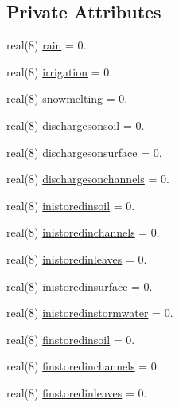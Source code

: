 \subsection*{Private Attributes}
\begin{DoxyCompactItemize}
\item 
real(8) \mbox{\hyperlink{structmodulebasin_1_1t__basinwaterbalance_a8f7c5330692702738e294ec2ccd8a474}{rain}} = 0.
\item 
real(8) \mbox{\hyperlink{structmodulebasin_1_1t__basinwaterbalance_a1dbb47de868c1a9349e7f869c9699a7c}{irrigation}} = 0.
\item 
real(8) \mbox{\hyperlink{structmodulebasin_1_1t__basinwaterbalance_a40065b32c6c5b9bbaade8b7ede889af0}{snowmelting}} = 0.
\item 
real(8) \mbox{\hyperlink{structmodulebasin_1_1t__basinwaterbalance_a606aef9b14a0836870ecaa5e7cbed6ba}{dischargesonsoil}} = 0.
\item 
real(8) \mbox{\hyperlink{structmodulebasin_1_1t__basinwaterbalance_a9ee971cf789e49184148ad047a0b6446}{dischargesonsurface}} = 0.
\item 
real(8) \mbox{\hyperlink{structmodulebasin_1_1t__basinwaterbalance_ab7a1622ba69b5813775a2c90e9eea6e9}{dischargesonchannels}} = 0.
\item 
real(8) \mbox{\hyperlink{structmodulebasin_1_1t__basinwaterbalance_aadd2708b18e1ac3061d23c041b14ee9e}{inistoredinsoil}} = 0.
\item 
real(8) \mbox{\hyperlink{structmodulebasin_1_1t__basinwaterbalance_af27f604da6da4fe6421d38503957d698}{inistoredinchannels}} = 0.
\item 
real(8) \mbox{\hyperlink{structmodulebasin_1_1t__basinwaterbalance_ab86803dbf9e2e58bb20347377f5ae87e}{inistoredinleaves}} = 0.
\item 
real(8) \mbox{\hyperlink{structmodulebasin_1_1t__basinwaterbalance_aee652ec996db5433bbaa3612d13ad2fa}{inistoredinsurface}} = 0.
\item 
real(8) \mbox{\hyperlink{structmodulebasin_1_1t__basinwaterbalance_ab4179b6de774ae66b204e1f945a70060}{inistoredinstormwater}} = 0.
\item 
real(8) \mbox{\hyperlink{structmodulebasin_1_1t__basinwaterbalance_a8027932cfbe90489271259f999eee03b}{finstoredinsoil}} = 0.
\item 
real(8) \mbox{\hyperlink{structmodulebasin_1_1t__basinwaterbalance_aab7225ff734bf118e075d3198adbe14b}{finstoredinchannels}} = 0.
\item 
real(8) \mbox{\hyperlink{structmodulebasin_1_1t__basinwaterbalance_a13317338c27f3aa23c9b9159fce3d491}{finstoredinleaves}} = 0.

\end{DoxyCompactItemize}
